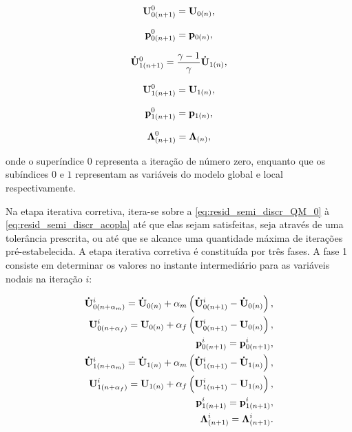 \begin{align}
	\mathbf{U}_{0(n+1)}^{0} = \mathbf{U}_{0(n)}, \label{eq:pred_vel_0}
\end{align}

\begin{align}
	\mathbf{p}_{0(n+1)}^{0} = \mathbf{p}_{0(n)},\label{eq:pred_press_0}
\end{align}

\begin{align}
	\mathbf{\dot{U}}_{1(n+1)}^{0} = \frac{\gamma-1}{\gamma}\mathbf{\dot{U}}_{1(n)} \label{eq:pred_acel_1},
\end{align}

\begin{align}
	\mathbf{U}_{1(n+1)}^{0} = \mathbf{U}_{1(n)}, \label{eq:pred_vel_1}
\end{align}

\begin{align}
	\mathbf{p}_{1(n+1)}^{0} = \mathbf{p}_{1(n)},\label{eq:pred_press_1}
\end{align}

\begin{align}
	\boldsymbol{\Lambda}_{(n+1)}^{0} = \boldsymbol{\Lambda}_{(n)},\label{eq:pred_lag_mult}
\end{align}

\noindent onde o superíndice $0$ representa a iteração de número zero, enquanto que os subíndices $0$ e $1$ representam as variáveis do modelo global e local respectivamente.

Na etapa iterativa corretiva, itera-se sobre a \autoref{eq:resid_semi_discr_QM_0} à \autoref{eq:resid_semi_discr_acopla} até que elas sejam satisfeitas, seja através de uma tolerância prescrita, ou até que se alcance uma quantidade máxima de iterações pré-estabelecida. A etapa iterativa corretiva é constituída por três fases. A fase 1 consiste em determinar os valores no instante intermediário para as variáveis nodais na iteração $i$:

\begin{align}
	\mathbf{\dot{U}}_{0({n+\alpha_m})}^{i} = \mathbf{\dot{U}}_{0(n)} + \alpha_m \left( \mathbf{\dot{U}}_{0(n+1)}^{i} - \mathbf{\dot{U}}_{0(n)} \right), \label{eq:inter_acel_0}\\
	\mathbf{U}_{0(n+\alpha_f)}^{i} = \mathbf{U}_{0(n)} + \alpha_f \left( \mathbf{U}_{0(n+1)}^{i} - \mathbf{U}_{0(n)} \right), \label{eq:inter_vel_0}\\
	\mathbf{p}_{0(n+1)}^{i} = \mathbf{p}_{0(n+1)}^{i}, \label{eq:inter_press_0} \\
	\mathbf{\dot{U}}_{1(n+\alpha_m)}^{i} = \mathbf{\dot{U}}_{1(n)} + \alpha_m \left( \mathbf{\dot{U}}_{1(n+1)}^{i} - \mathbf{\dot{U}}_{1(n)} \right), \label{eq:inter_acel_1}\\
	\mathbf{U}_{1(n+\alpha_f)}^{i} = \mathbf{U}_{1(n)} + \alpha_f \left( \mathbf{U}_{1(n+1)}^{i} - \mathbf{U}_{1(n)} \right), \label{eq:inter_vel_1}\\
	\mathbf{p}_{1(n+1)}^{i} = \mathbf{p}_{1(n+1)}^{i},\label{eq:inter_press_1} \\
	\boldsymbol{\Lambda}_{(n+1)}^{i} = \boldsymbol{\Lambda}_{(n+1)}^{i}. \label{eq:inter_lag_mult}
\end{align}

